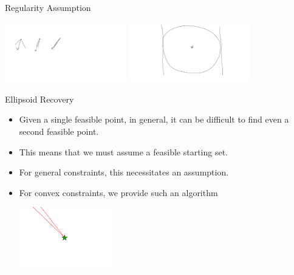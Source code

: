 \documentclass{beamer}
\begin{document}
\begin{frame}{Regularity Assumption}
	\begin{center}
		\includegraphics[width=200px]{images/uniform_regularity.png}
		\includegraphics[width=200px]{images/active_regularity.png}
	\end{center}
\end{frame}


\begin{frame}{Ellipsoid Recovery}
\begin{itemize}
	\item Given a single feasible point, in general, it can be difficult to find even a second feasible point.
	\item This means that we must assume a feasible starting set.
	\item For general constraints, this necessitates an assumption.
	\item For convex constraints, we provide such an algorithm
	\begin{center}
		\includegraphics[width=150px]{images/only_one_feasible_point.png}
	\end{center}
\end{itemize}
\end{frame}


\end{document}
